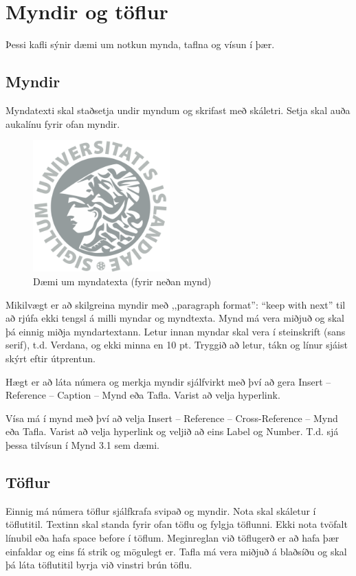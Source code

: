 \documentclass[a4paper, 12pt, twoside]{scrreprt}
\begin{document}
\chapter{Myndir og töflur}
Þessi kafli sýnir dæmi um notkun mynda, taflna og vísun í þær.
\section{Myndir}
Myndatexti skal staðsetja undir myndum og skrifast með skáletri.
Setja skal auða aukalínu fyrir ofan myndir.
\begin{figure}[!htb]
\centering
\includegraphics[width=0.47\textwidth]{uilogo}
\caption[Dæmi um myndatexta (fyrir neðan mynd).]{Dæmi um myndatexta (fyrir neðan mynd)} \label{fig:Array}
\end{figure}
Mikilvægt er að skilgreina myndir með ,,paragraph format”: “keep with next” til að rjúfa ekki tengsl á milli myndar og myndtexta. Mynd má vera miðjuð og skal þá einnig miðja myndartextann. Letur innan myndar skal vera í steinskrift (sans serif), t.d. Verdana, og ekki minna en 10 pt. Tryggið að letur, tákn og línur sjáist skýrt eftir útprentun.

Hægt er að láta númera og merkja myndir sjálfvirkt með því að gera Insert – Reference – Caption – Mynd eða Tafla. Varist að velja hyperlink. 

Vísa má í mynd með því að velja Insert – Reference – Cross-Reference – Mynd eða Tafla. Varist að velja hyperlink og veljið að eins Label og Number. T.d. sjá þessa tilvísun í Mynd 3.1 sem dæmi. 

\section{Töflur}
Einnig má númera töflur sjálfkrafa svipað og myndir. Nota skal skáletur í töflutitil. Textinn skal standa fyrir ofan töflu og fylgja töflunni.  Ekki nota tvöfalt línubil eða hafa space before í töflum. Meginreglan við töflugerð er að hafa þær einfaldar og eins fá strik og mögulegt er. Tafla má vera miðjuð á blaðsíðu og skal þá láta töflutitil byrja við vinstri brún töflu.
\end{document}
